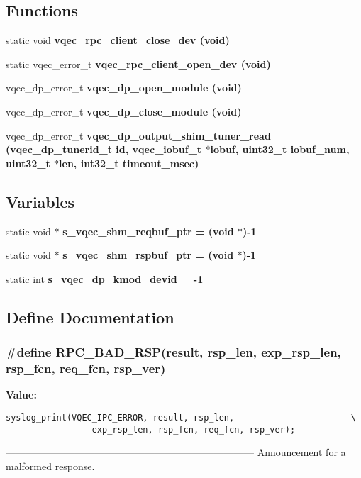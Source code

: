 \subsection*{Functions}
\begin{CompactItemize}
\item 
static void \bf{vqec\_\-rpc\_\-client\_\-close\_\-dev} (void)
\item 
static vqec\_\-error\_\-t \bf{vqec\_\-rpc\_\-client\_\-open\_\-dev} (void)
\item 
vqec\_\-dp\_\-error\_\-t \bf{vqec\_\-dp\_\-open\_\-module} (void)
\item 
vqec\_\-dp\_\-error\_\-t \bf{vqec\_\-dp\_\-close\_\-module} (void)
\item 
vqec\_\-dp\_\-error\_\-t \bf{vqec\_\-dp\_\-output\_\-shim\_\-tuner\_\-read} (vqec\_\-dp\_\-tunerid\_\-t id, vqec\_\-iobuf\_\-t $\ast$iobuf, uint32\_\-t iobuf\_\-num, uint32\_\-t $\ast$len, int32\_\-t timeout\_\-msec)
\end{CompactItemize}
\subsection*{Variables}
\begin{CompactItemize}
\item 
static void $\ast$ \bf{s\_\-vqec\_\-shm\_\-reqbuf\_\-ptr} = (void $\ast$)-1
\item 
static void $\ast$ \bf{s\_\-vqec\_\-shm\_\-rspbuf\_\-ptr} = (void $\ast$)-1
\item 
static int \bf{s\_\-vqec\_\-dp\_\-kmod\_\-devid} = -1
\end{CompactItemize}


\subsection{Define Documentation}
\subsubsection{\setlength{\rightskip}{0pt plus 5cm}\#define RPC\_\-BAD\_\-RSP(result, rsp\_\-len, exp\_\-rsp\_\-len, rsp\_\-fcn, req\_\-fcn, rsp\_\-ver)}\label{vqec__rpc__client_8c_581600ec75643f87e28d3ea8e320c444}


\textbf{Value:}

\begin{Code}\begin{verbatim}syslog_print(VQEC_IPC_ERROR, result, rsp_len,                       \
                 exp_rsp_len, rsp_fcn, req_fcn, rsp_ver);
\end{verbatim}\end{Code}
--------------------------------------------------------------------------- Announcement for a malformed response.

